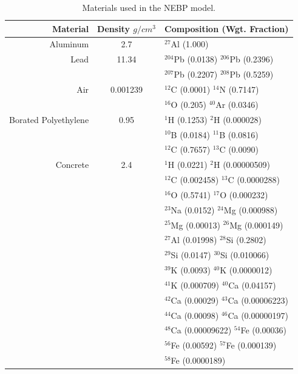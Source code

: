 \begin{table}[h]\centering
\caption{Materials used in the NEBP model.}
\begin{tabular}{ r c l }
\toprule
\textbf{Material} & \textbf{Density} $g/cm^3$ & \textbf{Composition (Wgt. Fraction)} \\
\midrule
Aluminum & 2.7 & $^{27}$Al (1.000) \\
\midrule
Lead & 11.34 & $^{204}$Pb (0.0138)  $^{206}$Pb (0.2396) \\
        & & $^{207}$Pb (0.2207)  $^{208}$Pb (0.5259) \\
\midrule
Air & 0.001239 & $^{12}$C (0.0001)  $^{14}$N (0.7147) \\
        & & $^{16}$O (0.205)  $^{40}$Ar (0.0346) \\
\midrule
Borated Polyethylene & 0.95 & $^{1}$H (0.1253)  $^{2}$H (0.000028) \\
                       &  & $^{10}$B (0.0184)   $^{11}$B (0.0816) \\
                       &  & $^{12}$C (0.7657)   $^{13}$C (0.0090) \\
\midrule
Concrete & 2.4 &  $^{1}$H (0.0221) $^{2}$H (0.00000509) \\
& &         $^{12}$C (0.002458)  $^{13}$C (0.0000288) \\
& &           $^{16}$O (0.5741)  $^{17}$O (0.000232) \\
& &          $^{23}$Na (0.0152)   $^{24}$Mg (0.000988) \\
& &          $^{25}$Mg (0.00013)   $^{26}$Mg (0.000149) \\
& &          $^{27}$Al (0.01998)   $^{28}$Si (0.2802) \\
& &          $^{29}$Si (0.0147)  $^{30}$Si (0.010066) \\
& &          $^{39}$K (0.0093)   $^{40}$K (0.0000012) \\
& &          $^{41}$K (0.000709)  $^{40}$Ca (0.04157) \\
& &          $^{42}$Ca (0.00029)    $^{43}$Ca (0.00006223) \\
& &          $^{44}$Ca (0.00098)   $^{46}$Ca (0.00000197) \\
& &          $^{48}$Ca (0.00009622)    $^{54}$Fe (0.00036) \\
& &          $^{56}$Fe (0.00592)   $^{57}$Fe (0.000139) \\
& &          $^{58}$Fe (0.0000189) \\
\bottomrule
\end{tabular}
\end{table}


